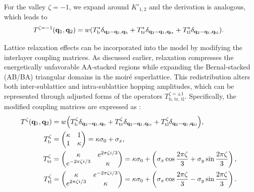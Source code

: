 For the valley $\zeta=-1$, we expand around $K'_{1,2}$ and the derivation is analogous, which leads to
\begin{equation} \label{eq:interlayer-3terms_valley-1}
T^{\zeta=-1}({\vb{q}}_1, {\vb{q}}_2) = w \qty(
T_{\text{b}}^* \delta_{{\vb{q}}_2 - {\vb{q}}_1, {\vb{q}}_\text{b}}
+ T_{\text{tr}}^* \delta_{{\vb{q}}_2 - {\vb{q}}_1, {\vb{q}}_\text{tr}}
+ T_{\text{tl}}^* \delta_{{\vb{q}}_2 - {\vb{q}}_1, {\vb{q}}_\text{tl}} ) .
\end{equation}

Lattice relaxation effects can be incorporated into the model by modifying the interlayer coupling matrices. As discussed earlier, relaxation compresses the energetically unfavorable AA-stacked regions while expanding the Bernal-stacked (AB/BA) triangular domains in the moiré superlattice. This redistribution alters both inter-sublattice and intra-sublattice hopping amplitudes, which can be represented through adjusted forms of the operators \( T_{\text{b, tr, tl}}^{\zeta=\pm 1} \). Specifically, the modified coupling matrices are expressed as \cite{thesis_angeli}:
\begin{align}
T^{\zeta}({\vb{q}}_1, {\vb{q}}_2) &= w \qty( T_{\text{b}}^\zeta \delta_{{\vb{q}}_2 - {\vb{q}}_1, {\vb{q}}_\text{b}} + T_{\text{tr}}^\zeta \delta_{{\vb{q}}_2 - {\vb{q}}_1, {\vb{q}}_\text{tr}} + T_{\text{tl}}^\zeta \delta_{{\vb{q}}_2 - {\vb{q}}_1, {\vb{q}}_\text{tl}} ), \\
T_{\text{b}}^\zeta &=
\begin{pmatrix}
\kappa & 1 \\
1 & \kappa
\end{pmatrix}
= \kappa \sigma_0 + \sigma_x,
\label{eq::T-qb-w0w1} \\
T_{\text{tr}}^\zeta &=
\begin{pmatrix}
\kappa & e^{2\pi \zeta i/3} \\
e^{-2\pi \zeta i/3} & \kappa
\end{pmatrix}
= \kappa \sigma_0 +
\left(
\sigma_x \cos \frac{2\pi \zeta}{3} + \sigma_y \sin \frac{2\pi \zeta}{3}
\right),
\label{eq::T-qtr-w0w1} \\
T_{\text{tl}}^\zeta &=
\begin{pmatrix}
\kappa & e^{-2\pi \zeta i/3} \\
e^{2\pi \zeta i/3} & \kappa
\end{pmatrix}
= \kappa \sigma_0 +
\left(
\sigma_x \cos \frac{2\pi \zeta}{3} - \sigma_y \sin \frac{2\pi \zeta}{3}
\right).
\label{eq::T-qb-w0w1}
\end{align}

